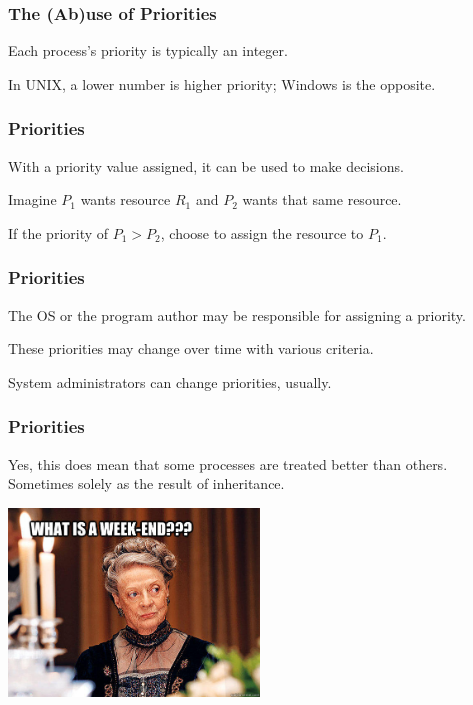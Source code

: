 \begin{frame}
\frametitle{The (Ab)use of Priorities}

Each process's priority is typically an integer. 

In UNIX, a lower number is higher priority; Windows is the opposite. 

\end{frame}

\begin{frame}
\frametitle{Priorities}

With a priority value assigned, it can be used to make decisions. 

Imagine $P_{1}$ wants resource $R_{1}$ and $P_{2}$ wants that same resource. 

If the priority of $P_{1} > P_{2}$, choose to assign the resource to $P_{1}$.

\end{frame}

\begin{frame}
\frametitle{Priorities}

The OS or the program author may be responsible for assigning a priority.

These priorities may change over time with various criteria. 

System administrators can change priorities, usually.

\end{frame}


\begin{frame}
\frametitle{Priorities}

Yes, this does mean that some processes are treated better than others.\\
\quad Sometimes solely as the result of inheritance.

\begin{center}
	\includegraphics[width=0.5\textwidth]{images/aristocrat.jpg}
\end{center}

\end{frame}

